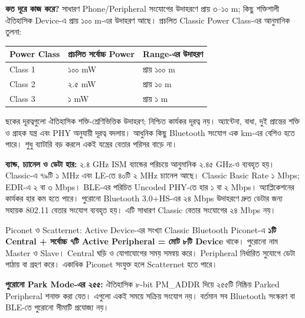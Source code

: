 \textbf{কত দূরে কাজ করে?} সাধারণ Phone/Peripheral সংযোগের উদাহরণে প্রায় ৩--১০ m; কিছু শক্তিশালী ঐতিহাসিক Device-এ প্রায় ১০০ m-এর উদাহরণ আছে। প্রচলিত Classic Power Class-এর আনুমানিক তুলনা:
\begin{tabularx}{\linewidth}{|p{.20\linewidth}|X|X|}\hline
\textbf{Power Class} & \textbf{প্রচলিত সর্বোচ্চ Power} & \textbf{Range-এর উদাহরণ}\\\hline
Class 1 & ১০০ mW & প্রায় ১০০ m\\\hline
Class 2 & ২.৫ mW & প্রায় ১০ m\\\hline
Class 3 & ১ mW & প্রায় ১ m\\\hline
\end{tabularx}
ছকের দূরত্বগুলো ঐতিহাসিক শক্তি-শ্রেণিভিত্তিক উদাহরণ; নিশ্চিত কার্যকর দূরত্ব নয়। অ্যান্টেনা, বাধা, দুই প্রান্তের শক্তি ও গ্রাহক যন্ত্র এবং PHY অনুযায়ী দূরত্ব বদলায়। আধুনিক কিছু Bluetooth সংযোগ এক km-এর বেশিও হতে পারে। শুধু ব্যাটারি বড় করলে একই যন্ত্রের বেতার পরিসর বাড়ে না।

\textbf{ব্যান্ড, চ্যানেল ও ডেটা হার:} ২.৪ GHz ISM ব্যান্ডের পরিচয়ে আনুমানিক ২.৪৫ GHz-ও ব্যবহৃত হয়। Classic-এ ৭৯টি ১ MHz এবং LE-তে ৪০টি ২ MHz চ্যানেল আছে। Classic Basic Rate ১ Mbps; EDR-এ ২ বা ৩ Mbps। BLE-এর পরিচিত Uncoded PHY-তে হার ১ বা ২ Mbps। অ্যাপ্লিকেশনের কার্যকর হার কম হতে পারে। পুরোনো Bluetooth 3.0+HS-এর ২৪ Mbps উদাহরণে দ্রুত ডেটার জন্য সহায়ক 802.11 বেতার সংযোগ ব্যবহৃত হয়। এটি সাধারণ Classic বেতার সংযোগের ২৪ Mbps নয়।

\begin{keypointbox}{Piconet ও Scatternet: Active Device-এর সংখ্যা}
Classic Bluetooth Piconet-এ \textbf{১টি Central + সর্বোচ্চ ৭টি Active Peripheral = মোট ৮টি Device} থাকে। পুরোনো নাম Master ও Slave। Central ঘড়ি ও যোগাযোগের সময় সমন্বয় করে। Peripheral নির্ধারিত সুযোগে ডেটা পাঠায় বা গ্রহণ করে। একাধিক Piconet সংযুক্ত হলে Scatternet হতে পারে।
\end{keypointbox}
\textbf{পুরোনো Park Mode-এর ২৫৫:} ঐতিহাসিক ৮-bit PM\_ADDR দিয়ে ২৫৫টি নিষ্ক্রিয় Parked Peripheral শনাক্ত করা যেত। এগুলো একই সময়ে সক্রিয় সংযোগ নয়। বর্তমান সব Bluetooth সংস্করণ বা BLE-তে পুরোনো সীমাটি প্রযোজ্য নয়।

